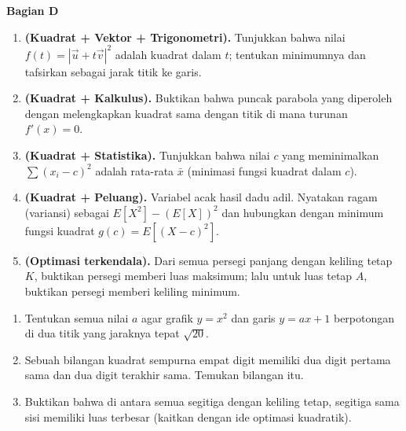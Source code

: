 \documentclass[11pt,a4paper]{report}
\theoremstyle{gaya}
\newcommand{\bagiansoal}[2]{%
  \par\medskip\noindent
  {\large\bfseries\color{biru}Bagian #1}\par\smallskip
  \addcontentsline{toc}{subsection}{Bagian #1}}
\begin{document}
\bagiansoal{D}{Expert (setara tahun pertama universitas --- sintesis antarbab)}
\begin{enumerate}[leftmargin=*]
  \item \textbf{(Kuadrat + Vektor + Trigonometri).} Tunjukkan bahwa nilai $f(t)=|\vec u+t\vec v|^2$ adalah kuadrat dalam $t$; tentukan minimumnya dan tafsirkan sebagai jarak titik ke garis.
  \item \textbf{(Kuadrat + Kalkulus).} Buktikan bahwa puncak parabola yang diperoleh dengan melengkapkan kuadrat sama dengan titik di mana turunan $f'(x)=0$.
  \item \textbf{(Kuadrat + Statistika).} Tunjukkan bahwa nilai $c$ yang meminimalkan $\sum (x_i-c)^2$ adalah rata-rata $\bar x$ (minimasi fungsi kuadrat dalam $c$).
  \item \textbf{(Kuadrat + Peluang).} Variabel acak hasil dadu adil. Nyatakan ragam (variansi) sebagai $E[X^2]-(E[X])^2$ dan hubungkan dengan minimum fungsi kuadrat $g(c)=E[(X-c)^2]$.
  \item \textbf{(Optimasi terkendala).} Dari semua persegi panjang dengan keliling tetap $K$, buktikan persegi memberi luas maksimum; lalu untuk luas tetap $A$, buktikan persegi memberi keliling minimum.
\end{enumerate}

\begin{challenge}
\begin{enumerate}[leftmargin=*,topsep=2pt]
  \item Tentukan semua nilai $a$ agar grafik $y=x^2$ dan garis $y=ax+1$ berpotongan di dua titik yang jaraknya tepat $\sqrt{20}$.
  \item Sebuah bilangan kuadrat sempurna empat digit memiliki dua digit pertama sama dan dua digit terakhir sama. Temukan bilangan itu.
  \item Buktikan bahwa di antara semua segitiga dengan keliling tetap, segitiga sama sisi memiliki luas terbesar (kaitkan dengan ide optimasi kuadratik).
\end{enumerate}
\end{challenge}

\end{document}
